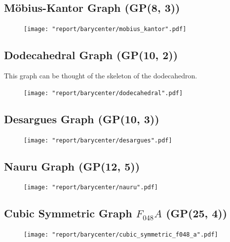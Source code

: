 \documentclass[11pt]{report}
\begin{document}
\pagebreak

\subsection{M{\"o}bius-Kantor Graph (GP(8, 3))}

\begin{figure}[H]
    \centering
    \texttt{[image: "report/barycenter/mobius\_kantor".pdf]}
\end{figure}

\subsection{Dodecahedral Graph (GP(10, 2))}
This graph can be thought of the skeleton of the dodecahedron.

\begin{figure}[H]
    \centering
    \texttt{[image: "report/barycenter/dodecahedral".pdf]}
\end{figure}

\pagebreak

\subsection{Desargues Graph (GP(10, 3))}
\begin{figure}[H]
    \centering
    \texttt{[image: "report/barycenter/desargues".pdf]}
\end{figure}

\pagebreak
\subsection{Nauru Graph (GP(12, 5))}
\begin{figure}[H]
    \centering
    \texttt{[image: "report/barycenter/nauru".pdf]}
\end{figure}

\pagebreak

\subsection{Cubic Symmetric Graph $F_{048} A$ (GP(25, 4))}

\begin{figure}[H]
    \centering
    \texttt{[image: "report/barycenter/cubic\_symmetric\_f048\_a".pdf]}
\end{figure}

\printbibliography
\end{document}
